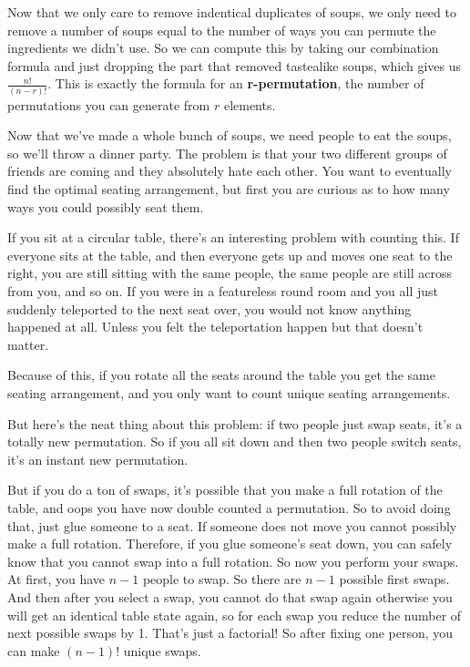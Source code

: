 \documentclass{article}
\begin{document}
    Now that we only care to remove indentical duplicates of soups, we only need to remove a number of soups equal to the number of ways you can permute the ingredients we didn't use.
    So we can compute this by taking our combination formula and just dropping the part that removed tastealike soups, which gives us
    $\frac{n!}{(n - r)!}$.
    This is exactly the formula for an \textbf{r-permutation}, the number of permutations you can generate from $r$ elements.

    Now that we've made a whole bunch of soups, we need people to eat the soups, so we'll throw a dinner party.
    The problem is that your two different groups of friends are coming and they absolutely hate each other.
    You want to eventually find the optimal seating arrangement, but first you are curious as to how many ways you could possibly seat them.

    If you sit at a circular table, there's an interesting problem with counting this.
    If everyone sits at the table, and then everyone gets up and moves one seat to the right, you are still sitting with the same people,
    the same people are still across from you, and so on.
    If you were in a featureless round room and you all just suddenly teleported to the next seat over, you would not know anything happened at all.
    Unless you felt the teleportation happen but that doesn't matter.

    Because of this, if you rotate all the seats around the table you get the same seating arrangement, and you only want to count unique seating arrangements.

    But here's the neat thing about this problem:
    if two people just swap seats, it's a totally new permutation.
    So if you all sit down and then two people switch seats, it's an instant new permutation.
    
    But if you do a ton of swaps, it's possible that you make a full rotation of the table, and oops you have now double counted a permutation.
    So to avoid doing that, just glue someone to a seat.
    If someone does not move you cannot possibly make a full rotation.
    Therefore, if you glue someone's seat down, you can safely know that you cannot swap into a full rotation.
    So now you perform your swaps.
    At first, you have $n-1$ people to swap.
    So there are $n-1$ possible first swaps.
    And then after you select a swap, you cannot do that swap again otherwise you will get an identical table state again,
    so for each swap you reduce the number of next possible swaps by 1.
    That's just a factorial!
    So after fixing one person, you can make $(n-1)!$ unique swaps.
\end{document}
